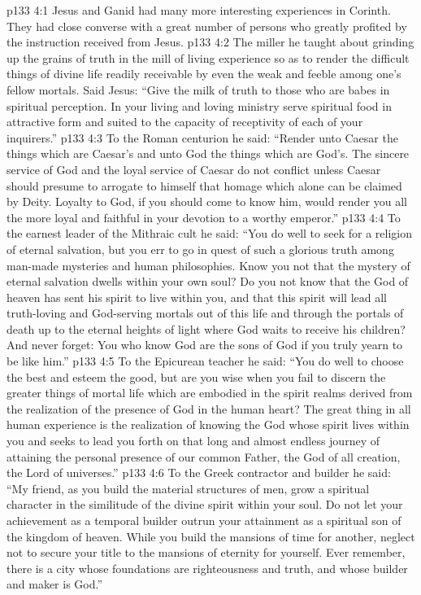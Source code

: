 \vs p133 4:1 Jesus and Ganid had many more interesting experiences in Corinth. They had close converse with a great number of persons who greatly profited by the instruction received from Jesus.
\pc \vs p133 4:2 The miller he taught about grinding up the grains of truth in the mill of living experience so as to render the difficult things of divine life readily receivable by even the weak and feeble among one’s fellow mortals. Said Jesus: \textcolor{ubdarkred}{“Give the milk of truth to those who are babes in spiritual perception. In your living and loving ministry serve spiritual food in attractive form and suited to the capacity of receptivity of each of your inquirers.”}
\pc \vs p133 4:3 To the Roman centurion he said: \textcolor{ubdarkred}{“Render unto Caesar the things which are Caesar’s and unto God the things which are God’s. The sincere service of God and the loyal service of Caesar do not conflict unless Caesar should presume to arrogate to himself that homage which alone can be claimed by Deity. Loyalty to God, if you should come to know him, would render you all the more loyal and faithful in your devotion to a worthy emperor.”}
\pc \vs p133 4:4 To the earnest leader of the Mithraic cult he said: \textcolor{ubdarkred}{“You do well to seek for a religion of eternal salvation, but you err to go in quest of such a glorious truth among man\hyp{}made mysteries and human philosophies. Know you not that the mystery of eternal salvation dwells within your own soul? Do you not know that the God of heaven has sent his spirit to live within you, and that this spirit will lead all truth\hyp{}loving and God\hyp{}serving mortals out of this life and through the portals of death up to the eternal heights of light where God waits to receive his children? And never forget: You who know God are the sons of God if you truly yearn to be like him.”}
\pc \vs p133 4:5 To the Epicurean teacher he said: \textcolor{ubdarkred}{“You do well to choose the best and esteem the good, but are you wise when you fail to discern the greater things of mortal life which are embodied in the spirit realms derived from the realization of the presence of God in the human heart? The great thing in all human experience is the realization of knowing the God whose spirit lives within you and seeks to lead you forth on that long and almost endless journey of attaining the personal presence of our common Father, the God of all creation, the Lord of universes.”}
\pc \vs p133 4:6 To the Greek contractor and builder he said: \textcolor{ubdarkred}{“My friend, as you build the material structures of men, grow a spiritual character in the similitude of the divine spirit within your soul. Do not let your achievement as a temporal builder outrun your attainment as a spiritual son of the kingdom of heaven. While you build the mansions of time for another, neglect not to secure your title to the mansions of eternity for yourself. Ever remember, there is a city whose foundations are righteousness and truth, and whose builder and maker is God.”}
